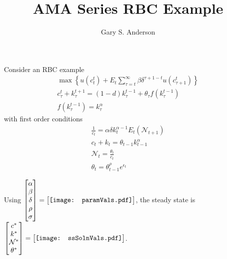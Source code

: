 \documentclass[12pt]{article}
\title{AMA Series RBC Example}
\author{Gary S. Anderson}
\begin{document}
\maketitle

Consider an RBC example \cite{Maliar2005}
 \begin{gather*}
   \max\left \{  u(c_t^t) + E_t \sum_{\tau=t}^\infty \beta \delta^{\tau+1-t}u(c_{\tau+1}^t)\right \}\\
c_\tau^t + k_\tau^{t+1}=(1-d)k_\tau^{t-1} + \theta_\tau f(k_\tau^{t-1})\\
f(k_\tau^{t-1})= k_\tau^\alpha
\end{gather*}
with first order conditions
\begin{gather}
\frac{1}{c_t}=\alpha \delta k_{t}^{\alpha-1} E_t \left (\mathcal{N}_{t+1}\right ) \nonumber\\
c_t + k_t=\theta_{t-1}k_{t-1}^\alpha \label{rbcSys}\\
\mathcal{N}_t=\frac{\theta_t}{c_t}\nonumber\\
 \theta_t =\theta_{t-1}^\rho e^{\epsilon_t}\nonumber
 \end{gather}


Using $\begin{bmatrix}
\alpha\\\beta\\\delta\\\rho\\\sigma
 \end{bmatrix}=
\begin{bmatrix}
\vcenter{\hbox{\texttt{[image: paramVals.pdf]}}}
 \end{bmatrix}$,  the steady state is $\begin{bmatrix}
c^\ast\\k^\ast\\\mathcal{N}^\ast\\\theta^\ast
 \end{bmatrix}=
\begin{bmatrix}
\vcenter{\hbox{\texttt{[image: ssSolnVals.pdf]}}}
 \end{bmatrix}$.
\end{document}
